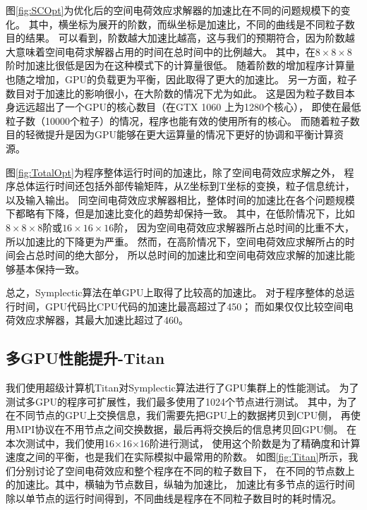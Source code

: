 图\eqref{fig:SCOpt}为优化后的空间电荷效应求解器的加速比在不同的问题规模下的变化。
其中，横坐标为展开的阶数，而纵坐标是加速比，不同的曲线是不同粒子数目的结果。
可以看到，阶数越大加速比越高，这与我们的预期符合，因为阶数越大意味着空间电荷求解器占用的时间在总时间中的比例越大。
其中，在$8\times8\times8$阶时加速比很低是因为在这种模式下的计算量很低。
随着阶数的增加程序计算量也随之增加，GPU的负载更为平衡，因此取得了更大的加速比。
另一方面，粒子数目对于加速比的影响很小，在大阶数的情况下尤为如此。
这是因为粒子数目本身远远超出了一个GPU的核心数目（在GTX 1060 上为1280个核心），
即使在最低粒子数（10000个粒子）的情况，程序也能有效的使用所有的核心。
而随着粒子数目的轻微提升是因为GPU能够在更大运算量的情况下更好的协调和平衡计算资源。

图\eqref{fig:TotalOpt}为程序整体运行时间的加速比，除了空间电荷效应求解之外，
程序总体运行时间还包括外部传输矩阵，从Z坐标到T坐标的变换，粒子信息统计，以及输入输出。
同空间电荷效应求解器相比，整体时间的加速比在各个问题规模下都略有下降，但是加速比变化的趋势却保持一致。
其中，在低阶情况下，比如$8\times8\times8$阶或$16\times16\times16$阶，
因为空间电荷效应求解器所占总时间的比重不大，所以加速比的下降更为严重。
然而，在高阶情况下，空间电荷效应求解所占的时间会占总时间的绝大部分，
所以总时间的加速比和空间电荷效应求解的加速比能够基本保持一致。

总之，Symplectic算法在单GPU上取得了比较高的加速比。
对于程序整体的总运行时间，GPU代码比CPU代码的加速比最高超过了450；
而如果仅仅比较空间电荷效应求解器，其最大加速比超过了460。

\subsection{多GPU性能提升-Titan}
我们使用超级计算机Titan对Symplectic算法进行了GPU集群上的性能测试。
为了测试多GPU的程序可扩展性，我们最多使用了1024个节点进行测试。
其中，为了在不同节点的GPU上交换信息，我们需要先把GPU上的数据拷贝到CPU侧，
再使用MPI协议在不用节点之间交换数据，最后再将交换后的信息拷贝回GPU侧。
在本次测试中，我们使用16$\times$16$\times$16阶进行测试，
使用这个阶数是为了精确度和计算速度之间的平衡，也是我们在实际模拟中最常用的阶数。
如图\eqref{fig:Titan}所示，我们分别讨论了空间电荷效应和整个程序在不同的粒子数目下，
在不同的节点数上的加速比。其中，横轴为节点数目，纵轴为加速比，
加速比有多节点的运行时间除以单节点的运行时间得到，不同曲线是程序在不同粒子数目时的耗时情况。

